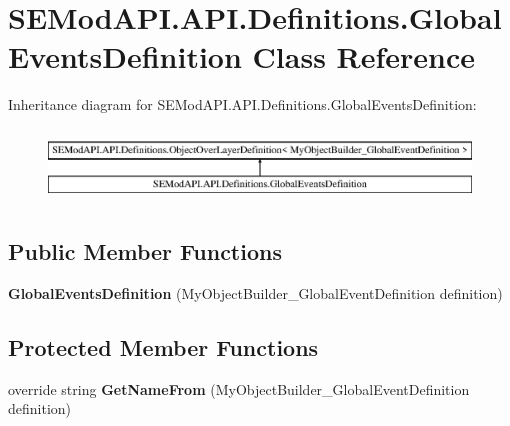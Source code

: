 \hypertarget{class_s_e_mod_a_p_i_1_1_a_p_i_1_1_definitions_1_1_global_events_definition}{}\section{S\+E\+Mod\+A\+P\+I.\+A\+P\+I.\+Definitions.\+Global\+Events\+Definition Class Reference}
\label{class_s_e_mod_a_p_i_1_1_a_p_i_1_1_definitions_1_1_global_events_definition}
Inheritance diagram for S\+E\+Mod\+A\+P\+I.\+A\+P\+I.\+Definitions.\+Global\+Events\+Definition\+:\begin{figure}[H]
\begin{center}
\leavevmode
\includegraphics[height=1.961471cm]{class_s_e_mod_a_p_i_1_1_a_p_i_1_1_definitions_1_1_global_events_definition}
\end{center}
\end{figure}
\subsection*{Public Member Functions}
\begin{DoxyCompactItemize}
\item 
\hypertarget{class_s_e_mod_a_p_i_1_1_a_p_i_1_1_definitions_1_1_global_events_definition_a86dc29a3e0fc40430cd500dbd1ca96ec}{}{\bfseries Global\+Events\+Definition} (My\+Object\+Builder\+\_\+\+Global\+Event\+Definition definition)\label{class_s_e_mod_a_p_i_1_1_a_p_i_1_1_definitions_1_1_global_events_definition_a86dc29a3e0fc40430cd500dbd1ca96ec}

\end{DoxyCompactItemize}
\subsection*{Protected Member Functions}
\begin{DoxyCompactItemize}
\item 
\hypertarget{class_s_e_mod_a_p_i_1_1_a_p_i_1_1_definitions_1_1_global_events_definition_a0104f6d1c92d47b5b60a0286ecfa54de}{}override string {\bfseries Get\+Name\+From} (My\+Object\+Builder\+\_\+\+Global\+Event\+Definition definition)\label{class_s_e_mod_a_p_i_1_1_a_p_i_1_1_definitions_1_1_global_events_definition_a0104f6d1c92d47b5b60a0286ecfa54de}

\end{DoxyCompactItemize}
